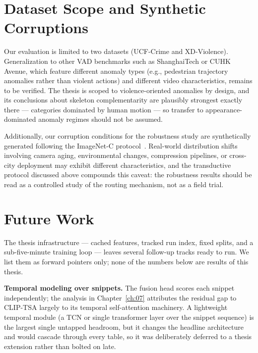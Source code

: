 \section{Dataset Scope and Synthetic Corruptions}
\label{sec:lim-scope}

Our evaluation is limited to two datasets (UCF-Crime and XD-Violence).
Generalization to other VAD benchmarks such as ShanghaiTech or CUHK Avenue,
which feature different anomaly types (e.g., pedestrian trajectory anomalies
rather than violent actions) and different video characteristics, remains to
be verified. The thesis is scoped to violence-oriented anomalies by design,
and its conclusions about skeleton complementarity are plausibly strongest
exactly there --- categories dominated by human motion --- so transfer to
appearance-dominated anomaly regimes should not be assumed.

Additionally, our corruption conditions for the robustness study are
synthetically generated following the ImageNet-C
protocol~\cite{hendrycks2019imagenetc}. Real-world distribution shifts
involving camera aging, environmental changes, compression pipelines, or
cross-city deployment may exhibit different characteristics, and the
transductive protocol discussed above compounds this caveat: the robustness
results should be read as a controlled study of the routing mechanism, not as
a field trial.

\section{Future Work}
\label{sec:lim-future}

The thesis infrastructure --- cached features, tracked run index, fixed
splits, and a sub-five-minute training loop --- leaves several follow-up
tracks ready to run. We list them as forward pointers only; none of the
numbers below are results of this thesis.

\textbf{Temporal modeling over snippets.} The fusion head scores each snippet
independently; the analysis in Chapter~\ref{ch:07} attributes the residual gap
to CLIP-TSA largely to its temporal self-attention machinery. A lightweight
temporal module (a TCN or single transformer layer over the snippet sequence)
is the largest single untapped headroom, but it changes the headline
architecture and would cascade through every table, so it was deliberately
deferred to a thesis extension rather than bolted on late.


